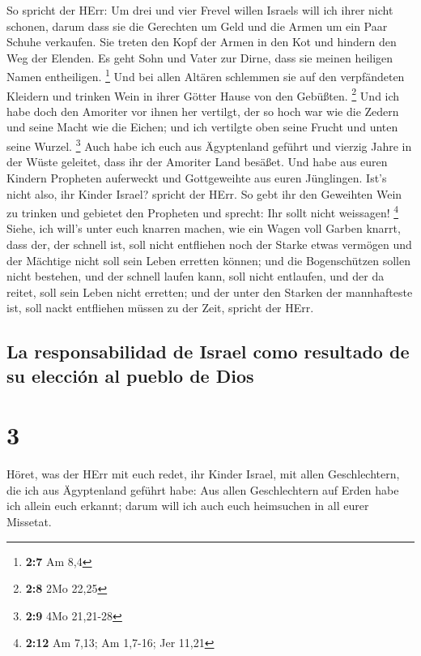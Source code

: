  So spricht der HErr: Um drei und vier Frevel willen
Israels will ich ihrer nicht schonen, darum dass sie die Gerechten um
Geld und die Armen um ein Paar Schuhe verkaufen.  Sie
treten den Kopf der Armen in den Kot und hindern den Weg der Elenden. Es
geht Sohn und Vater zur Dirne, dass sie meinen heiligen Namen
entheiligen. \footnote{\textbf{2:7} Am 8,4}  Und bei allen
Altären schlemmen sie auf den verpfändeten Kleidern und trinken Wein in
ihrer Götter Hause von den Gebüßten. \footnote{\textbf{2:8} 2Mo 22,25}
 Und ich habe doch den Amoriter vor ihnen her vertilgt,
der so hoch war wie die Zedern und seine Macht wie die Eichen; und ich
vertilgte oben seine Frucht und unten seine Wurzel. \footnote{\textbf{2:9}
  4Mo 21,21-28}  Auch habe ich euch aus Ägyptenland
geführt und vierzig Jahre in der Wüste geleitet, dass ihr der Amoriter
Land besäßet.  Und habe aus euren Kindern Propheten
auferweckt und Gottgeweihte aus euren Jünglingen. Ist's nicht also, ihr
Kinder Israel? spricht der HErr.  So gebt ihr den
Geweihten Wein zu trinken und gebietet den Propheten und sprecht: Ihr
sollt nicht weissagen! \footnote{\textbf{2:12} Am 7,13; Am 1,7-16; Jer
  11,21}  Siehe, ich will's unter euch knarren machen,
wie ein Wagen voll Garben knarrt,  dass der, der schnell
ist, soll nicht entfliehen noch der Starke etwas vermögen und der
Mächtige nicht soll sein Leben erretten können;  und die
Bogenschützen sollen nicht bestehen, und der schnell laufen kann, soll
nicht entlaufen, und der da reitet, soll sein Leben nicht erretten;
 und der unter den Starken der mannhafteste ist, soll
nackt entfliehen müssen zu der Zeit, spricht der HErr.

\hypertarget{la-responsabilidad-de-israel-como-resultado-de-su-elecciuxf3n-al-pueblo-de-dios}{%
\subsection{La responsabilidad de Israel como resultado de su elección
al pueblo de
Dios}\label{la-responsabilidad-de-israel-como-resultado-de-su-elecciuxf3n-al-pueblo-de-dios}}

\hypertarget{section-2}{%
\section{3}\label{section-2}}

 Höret, was der HErr mit euch redet, ihr Kinder Israel,
mit allen Geschlechtern, die ich aus Ägyptenland geführt habe:
 Aus allen Geschlechtern auf Erden habe ich allein euch
erkannt; darum will ich auch euch heimsuchen in all eurer Missetat.

